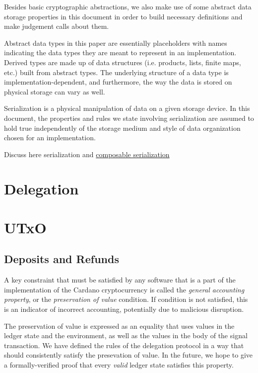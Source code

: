 \documentclass[11pt,a4paper]{article}
\theoremstyle{definition}
\theoremstyle{definition}
\begin{document}
Besides basic cryptographic abstractions, we also make use of some abstract
data storage properties in this document in order to build necessary definitions
and make judgement calls about them.

Abstract data types in this paper are essentially placeholders with names
indicating the data types they are meant to represent in an implementation.
Derived types are made up of data structures (i.e. products, lists, finite
maps, etc.) built from abstract types. The underlying structure of a data type
is implementation-dependent, and furthermore, the way the data is stored on
physical storage can vary as well.

Serialization is a physical manipulation of data on a given storage device.
In this document, the properties and rules we state involving serialization are
assumed to hold true independently of the storage medium and style of data
organization chosen for an implementation.


\begin{todo}
  Discuss here serialization and
  \href{https://iohk.myjetbrains.com/youtrack/issue/CDEC-628}{composable
    serialization}
\end{todo}

\section{Delegation}
\label{sec:delegation}



\section{UTxO}
\label{sec:utxo}

\subsection{Deposits and Refunds}
\label{sec:deps-refunds}

A key constraint that must be satisfied by any software that is a part of
the implementation of the
Cardano cryptocurrency is called the \textit{general accounting
property}, or the \textit{preservation of value} condition. If
condition is not satisfied, this is an indicator of
incorrect accounting, potentially due to
malicious disruption.

The preservation of value is expressed as an equality that uses values in
the ledger state and the environment, as well as the values in the body of
the signal transaction.
We have defined the rules of the delegation protocol in a way that should
consistently satisfy the presevation of value. In the future, we hope to
give a formally-verified proof that every \textit{valid} ledger state satisfies
this property.
\end{document}
